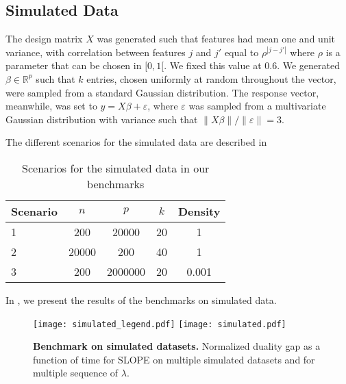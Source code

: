 \subsection{Simulated Data}
\label{sec:experiments-real-data}

The design matrix $X$ was generated such that features had mean one and unit variance, with correlation between features $j$ and $j'$ equal to $\rho^{|j-j'|}$ where $\rho$ is a parameter that can be chosen in $[0, 1[$.
We fixed this value at $0.6$.
We generated \(\beta \in \mathbb{R}^p\) such that \(k\) entries, chosen uniformly at random throughout the vector, were sampled from a standard Gaussian distribution.
The response vector, meanwhile, was set to $y=X\beta + \varepsilon$, where
$\varepsilon$ was sampled from a multivariate Gaussian distribution with variance such that $\lVert X\beta\rVert / \lVert \varepsilon \rVert = 3$.

The different scenarios for the simulated data are described in 

\begin{table}[hbt]
  \centering
  \caption{Scenarios for the simulated data in our benchmarks}
  \label{tab:simulated-data}
  \begin{tabular}{
      l
      S[table-format=5.0,round-mode=off]
      S[table-format=7.0,round-mode=off]
      S[table-format=2.0,round-mode=off]
      S[table-format=1.3,round-mode=off]
    }
    \toprule
    {Scenario} & \(n\) & \(p\)   & \(k\) & {Density} \\           & 200   & 20000   & 20    & 1         \\
    2          & 20000 & 200     & 40    & 1         \\
    3          & 200   & 2000000 & 20    & 0.001     \\ \bottomrule
  \end{tabular}
\end{table}

In , we present the results of the benchmarks on simulated data.

\begin{figure*}[!t]
  \centering
  \texttt{[image: simulated\_legend.pdf]}
  \texttt{[image: simulated.pdf]}
  \caption{\textbf{Benchmark on simulated datasets.} Normalized duality gap as a function of time for SLOPE on multiple simulated datasets and for multiple sequence of $\lambda$.}
  \label{fig:simulated}
\end{figure*}

